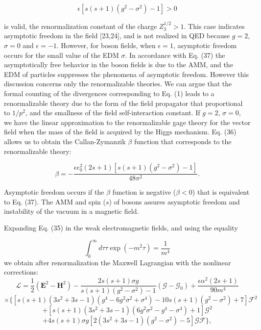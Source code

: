\documentclass[a4paper,12pt]{article}
\begin{document}
\begin{equation}
\epsilon \left[ s(s+1)\left( g^2-\sigma ^2\right) -1\right] >0  \label{37}
\end{equation}

is valid, the renormalization constant of the charge $Z_3^{1/2}>1$. This
case indicates asymptotic freedom in the field [23,24], and is not realized
in QED because $g=2$, $\sigma =0$ and $\epsilon =-1$. However, for boson
fields, when $\epsilon =1$, asymptotic freedom occurs for the small value of
the EDM $\sigma $. In accordance with Eq. (37) the asymptotically free
behavior in the boson fields is due to the AMM, and the EDM of particles
suppresses the phenomena of asymptotic freedom. However this discussion
concerns only the renormalizable theories. We can argue that the formal
counting of the divergences corresponding to Eq. (1) leads to a
renormalizable theory due to the form of the field propagator that
proportional to $1/p^2$, and the smallness of the field self-interaction
constant. If $g=2$, $\sigma =0$, we have the linear approximation to the
renormalizable gage theory for the vector field when the mass of the field
is acquired by the Higgs mechanism. Eq. (36) allows us to obtain the
Callan-Zymanzik $\beta $ function that corresponds to the renormalizable
theory:

\begin{equation}
\beta =-\frac{\epsilon e_0^2\left( 2s+1\right) \left[ s(s+1)\left(
g^2-\sigma ^2\right) -1\right] }{48\pi ^2}.  \label{38}
\end{equation}

Asymptotic freedom occurs if the $\beta $ function is negative ($\beta <0$)
that is equivalent to Eq. (37). The AMM and spin ($s$) of bosons assures
asymptotic freedom and instability of the vacuum in a magnetic field.

Expanding Eq. (35) in the weak electromagnetic fields, and using the equality

\[
\int_0^\infty d\tau \tau \exp \left( -m^2\tau \right) =\frac 1{m^4}
\]
we obtain after renormalization the Maxwell Lagrangian with the nonlinear
corrections:
\[
\mathcal{L}=\frac 12\left( \mathbf{E}^2-\mathbf{H}^2\right) -\frac{
2s(s+1)\sigma g}{s(s+1)(g^2-\sigma ^2)-1}\left( \mathcal{G}-\mathcal{G}
_0\right) +\frac{\epsilon \alpha ^2(2s+1)}{90m^4}
\]
\[
\times \biggl \{
\left[ s(s+1)(3s^2+3s-1)\left( g^4-6g^2\sigma ^2+\sigma ^4\right)
-10s(s+1)(g^2-\sigma ^2)+7\right] \mathcal{F}^2
\]
\vspace{-8mm}
\begin{equation}  \label{39}
\end{equation}
\vspace{-8mm}
\[
+\left[ s(s+1)(3s^2+3s-1)\left( 6g^2\sigma ^2-g^4-\sigma ^4\right) +1\right]
\mathcal{G}^2
\]
\[
+4s(s+1)\sigma g\left[ 2(3s^2+3s-1)\left( g^2-\sigma ^2\right) -5\right]
\mathcal{GF}\biggr \},
\]
\end{document}
